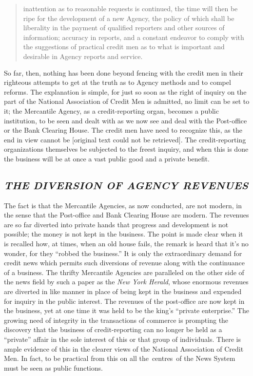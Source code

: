 \documentclass[twoside,symmetric,nobib,justified]{tufte-book}
\begin{document}
\begin{quote}
inattention as to reasonable requests is continued, the time will then
be ripe for the development of a new Agency, the policy of which shall
be liberality in the payment of qualified reporters and other sources of
information; accuracy in reports, and a constant endeavor to comply with
the suggestions of practical credit men as to what is important and
desirable in Agency reports and service.
\end{quote}

So far, then, nothing has been done beyond fencing with the credit men
in their righteous attempts to get at the truth as to Agency methods and
to compel reforms. The explanation is simple, for just so soon as the
right of inquiry on the part of the National Association of Credit Men
is admitted, no limit can be set to it; the Mercantile Agency, as a
credit-reporting organ, becomes a public institution, to be seen and
dealt with as we now see and deal with the Post-office or the Bank
Clearing House. The credit men have need to recognize this, as the end
in view cannot be {[}original text could not be retrieved{]}. The
credit-reporting organizations themselves be subjected to the freest
inquiry, and when this is done the business will be at once a vast
public good and a private benefit.~

\hypertarget{the-diversion-of-agency-revenues}{%
\subsection{\texorpdfstring{\emph{THE DIVERSION OF AGENCY
REVENUES}}{THE DIVERSION OF AGENCY REVENUES}}\label{the-diversion-of-agency-revenues}}

The fact is that the Mercantile Agencies, as now conducted, are not
modern, in the sense that the Post-office and Bank Clearing House are
modern. The revenues are so far diverted into private hands that
progress and development is not possible; the money is not kept in the
business. The point is made clear when it is recalled how, at times,
when an old house fails, the remark is heard that it's no wonder, for
they ``robbed the business.'' It is only the extraordinary demand for
credit news which permits such diversions of revenue along with the
continuance of a business. The thrifty Mercantile Agencies are
paralleled on the other side of the news field by such a paper as the
\emph{New York Herald}, whose enormous revenues are diverted in like
manner in place of being kept in the business and expended for inquiry
in the public interest. The revenues of the post-office are now kept in
the business, yet at one time it was held to be the king's ``private
enterprise.'' The growing need of integrity in the transactions of
commerce is prompting the discovery that the business of
credit-reporting can no longer be held as a ``private'' affair in the
sole interest of this or that group of individuals. There is ample
evidence of this in the clearer views of the National Association of
Credit Men. In fact, to be practical from this on all the~centres~of the
News System must be seen as public functions.~
\end{document}
